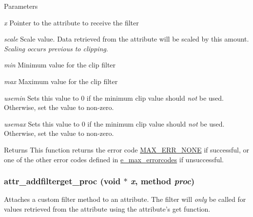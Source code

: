 \begin{DoxyParams}{Parameters}
\item[{\em x}]Pointer to the attribute to receive the filter \item[{\em scale}]Scale value. Data retrieved from the attribute will be scaled by this amount. {\itshape Scaling occurs previous to clipping\/}. \item[{\em min}]Minimum value for the clip filter \item[{\em max}]Maximum value for the clip filter \item[{\em usemin}]Sets this value to 0 if the minimum clip value should {\itshape not\/} be used. Otherwise, set the value to non-\/zero. \item[{\em usemax}]Sets this value to 0 if the minimum clip value should {\itshape not\/} be used. Otherwise, set the value to non-\/zero.\end{DoxyParams}
\begin{DoxyReturn}{Returns}
This function returns the error code \hyperlink{group__misc_gga0764dd6c02b76cca7d053ae50555d69da6d22f77fef8b1e1b074cef5d29d935fd}{MAX\_\-ERR\_\-NONE} if successful, or one of the other error codes defined in \hyperlink{group__misc_ga0764dd6c02b76cca7d053ae50555d69d}{e\_\-max\_\-errorcodes} if unsuccessful. 
\end{DoxyReturn}
\hypertarget{group__attr_ga154ccd467976ee75a53ee312e9d1b3fc}{
\subsubsection[{attr\_\-addfilterget\_\-proc}]{ attr\_\-addfilterget\_\-proc (void $\ast$ {\em x}, \/  {\bf method} {\em proc})}}
\label{group__attr_ga154ccd467976ee75a53ee312e9d1b3fc}


Attaches a custom filter method to an attribute. The filter will {\itshape only\/} be called for values retrieved from the attribute using the attribute's {\ttfamily get} function.


